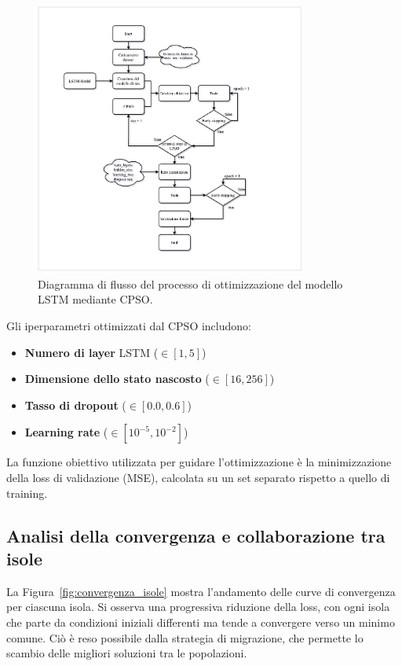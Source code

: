 \documentclass{article}
\begin{document}
\begin{figure}[H]
\centering
\includegraphics[width=0.8\textwidth]{img/LSTM-CPSO-MODEL.png}
\caption{Diagramma di flusso del processo di ottimizzazione del modello LSTM mediante CPSO.}
\label{fig:cpso_flowchart}
\end{figure}

Gli iperparametri ottimizzati dal CPSO includono:
\begin{itemize}
    \item \textbf{Numero di layer} LSTM ($\in [1, 5]$)
    \item \textbf{Dimensione dello stato nascosto} ($\in [16, 256]$)
    \item \textbf{Tasso di dropout} ($\in [0.0, 0.6]$)
    \item \textbf{Learning rate} ($\in [10^{-5}, 10^{-2}]$)
\end{itemize}

La funzione obiettivo utilizzata per guidare l’ottimizzazione è la minimizzazione della loss di validazione 
(MSE), calcolata su un set separato rispetto a quello di training.

\subsection{Analisi della convergenza e collaborazione tra isole}

La Figura~\ref{fig:convergenza_isole} mostra l'andamento delle curve di convergenza per ciascuna isola. 
Si osserva una progressiva riduzione della loss, con ogni isola che parte da condizioni iniziali differenti 
ma tende a convergere verso un minimo comune. Ciò è reso possibile dalla strategia di migrazione, che 
permette lo scambio delle migliori soluzioni tra le popolazioni.
\end{document}
